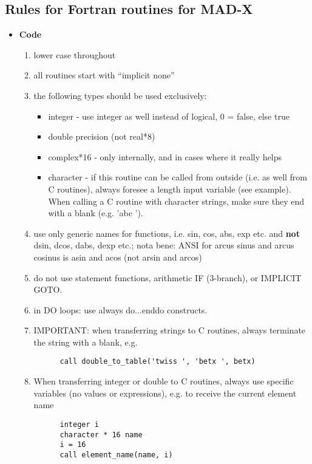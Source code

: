 


\subsection{ Rules for Fortran routines for MAD-X}
\label{subsec:fortran_rules}

\begin{itemize}
 
   \item \textbf{ Code}
     \begin{enumerate}
        \item lower case throughout
	\item all routines start with ``implicit none''
	\item the following types should be used exclusively:    
          \begin{itemize}
	     \item integer - use integer as well instead of logical, 0 = false, else true
	     \item double precision (not real*8)
	     \item complex*16 - only internally, and in cases where it really helps
	     \item character - if this routine can be called from
               outside (i.e. as well from C routines), always foresee a
               length input variable (see example). When calling a C
               routine with character strings, make sure they end with a
               blank (e.g. 'abc ').    
          \end{itemize}
	\item use only generic names for functions, i.e. sin, cos, abs,
          exp etc. and \textbf{ not} dsin, dcos, dabs, dexp etc.;
          nota bene: ANSI for arcus sinus and arcus cosinus is asin
          and acos (not arsin and arcos)   
	\item do not use statement functions, arithmetic IF (3-branch), or IMPLICIT GOTO.  
	\item in DO loops: use always do...enddo constructs.  
	\item IMPORTANT: when transferring  strings to C routines, always terminate the string with a blank, e.g. 
\begin{verbatim}
      call double_to_table('twiss ', 'betx ', betx)
\end{verbatim}
        \item When transferring  integer or double to C routines, always
          use     specific variables (no values or expressions), e.g. to
          receive the     current element name  
\begin{verbatim}
      integer i
      character * 16 name
      i = 16
      call element_name(name, i)
\end{verbatim}
     \end{enumerate}


\end{itemize}

